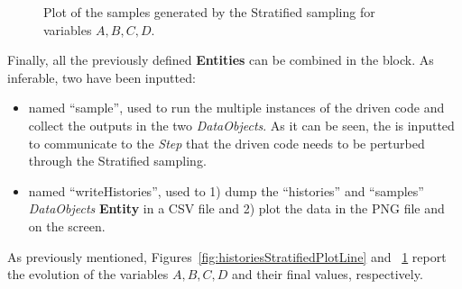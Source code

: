 \begin{enumerate}
\begin{figure}[h!]
  \caption{Plot of the samples generated by the Stratified sampling for variables $A,B,C,D$.}
  \label{fig:samplesStratifiedPlotLine}
 \end{figure}
   Finally, all the previously defined \textbf{Entities} can be combined in
   the  block. As inferable,
   two  have been inputted:
   \begin{itemize}
     \item {} named ``sample'', used to run the multiple
     instances of the driven code and
     collect the outputs in the two \textit{DataObjects}. As it can be
     seen, the  is inputted to communicate to the
     \textit{Step} that the driven code needs to
     be perturbed through the Stratified sampling.
     \item  {} named ``writeHistories'', used to 1) dump
     the ``histories'' and ``samples'' \textit{DataObjects}
     \textbf{Entity} in a CSV file and 2) plot the data in the PNG file and
     on the screen.
   \end{itemize}
\end{enumerate}
 As previously mentioned, Figures~\ref{fig:historiesStratifiedPlotLine} and ~\ref{fig:samplesStratifiedPlotLine}  report the evolution of the
 variables $A,B,C,D$ and their final values, respectively.


